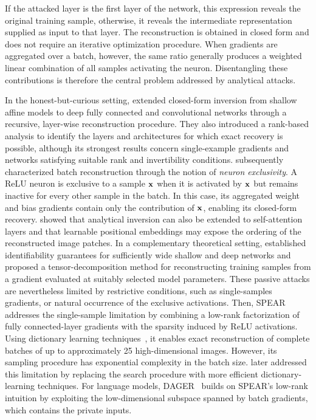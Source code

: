 If the attacked layer is the first layer of the network, this expression
reveals the original training sample, otherwise, it reveals the
intermediate representation supplied as input to that layer. The
reconstruction is obtained in closed form and does not require an
iterative optimization procedure. When gradients are aggregated over a
batch, however, the same ratio generally produces a weighted linear
combination of all samples activating the neuron. Disentangling these
contributions is therefore the central problem addressed by
analytical attacks.

In the honest-but-curious setting,
 extended closed-form inversion from
shallow affine models to deep fully connected and convolutional networks
through a recursive, layer-wise reconstruction procedure. They also
introduced a rank-based analysis to identify the layers and
architectures for which exact recovery is possible, although its
strongest results concern single-example gradients and networks
satisfying suitable rank and invertibility conditions.
 subsequently characterized batch reconstruction through
the notion of \emph{neuron exclusivity}. A ReLU neuron is exclusive to a
sample ${\mathbf{x}}$ when it is activated by ${\mathbf{x}}$ but remains inactive for
every other sample in the batch. In this case, its aggregated weight and
bias gradients contain only the contribution of ${\mathbf{x}}$, enabling its
closed-form recovery.  showed that
analytical inversion can also be extended to self-attention layers and
that learnable positional embeddings may expose the ordering of the
reconstructed image patches. In a complementary theoretical setting,
 established
identifiability guarantees for sufficiently wide shallow and deep
networks and proposed a tensor-decomposition method for reconstructing training samples from a gradient evaluated at suitably selected model parameters. These passive attacks are nevertheless limited by restrictive conditions, such as single-samples gradients, or natural occurrence of the exclusive activations. Then, SPEAR~\cite{dimitrovSPEARExactGradient2024} addresses the single-sample limitation by combining a low-rank factorization of fully connected-layer gradients with the sparsity induced by ReLU activations. Using dictionary learning techniques~\cite{pmlr-v23-spielman12}, it enables exact reconstruction of complete batches of up to approximately 25 high-dimensional images. However, its sampling procedure has exponential complexity in the batch size.  later addressed this limitation by replacing the search procedure with more efficient dictionary-learning techniques. For language models, DAGER~\cite{petrovDAGERExactGradient2024} builds on SPEAR's low-rank intuition by exploiting the low-dimensional subspace spanned by batch gradients, which contains the private inputs.

